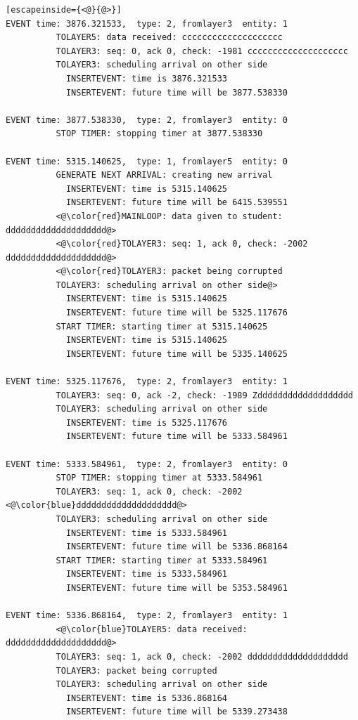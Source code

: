 \documentclass[paper=a4, fontsize=11pt]{scrartcl}
\numberwithin{equation}{section}		%
\numberwithin{figure}{section}			%
\numberwithin{table}{section}				%
\begin{document}
\begin{lstlisting}[escapeinside={<@}{@>}]
EVENT time: 3876.321533,  type: 2, fromlayer3  entity: 1
          TOLAYER5: data received: cccccccccccccccccccc
          TOLAYER3: seq: 0, ack 0, check: -1981 cccccccccccccccccccc
          TOLAYER3: scheduling arrival on other side
            INSERTEVENT: time is 3876.321533
            INSERTEVENT: future time will be 3877.538330

EVENT time: 3877.538330,  type: 2, fromlayer3  entity: 0
          STOP TIMER: stopping timer at 3877.538330

EVENT time: 5315.140625,  type: 1, fromlayer5  entity: 0
          GENERATE NEXT ARRIVAL: creating new arrival
            INSERTEVENT: time is 5315.140625
            INSERTEVENT: future time will be 6415.539551
          <@\color{red}MAINLOOP: data given to student: dddddddddddddddddddd@>
          <@\color{red}TOLAYER3: seq: 1, ack 0, check: -2002 dddddddddddddddddddd@>
          <@\color{red}TOLAYER3: packet being corrupted
          TOLAYER3: scheduling arrival on other side@>
            INSERTEVENT: time is 5315.140625
            INSERTEVENT: future time will be 5325.117676
          START TIMER: starting timer at 5315.140625
            INSERTEVENT: time is 5315.140625
            INSERTEVENT: future time will be 5335.140625

EVENT time: 5325.117676,  type: 2, fromlayer3  entity: 1
          TOLAYER3: seq: 0, ack -2, check: -1989 Zddddddddddddddddddd
          TOLAYER3: scheduling arrival on other side
            INSERTEVENT: time is 5325.117676
            INSERTEVENT: future time will be 5333.584961

EVENT time: 5333.584961,  type: 2, fromlayer3  entity: 0
          STOP TIMER: stopping timer at 5333.584961
          TOLAYER3: seq: 1, ack 0, check: -2002 <@\color{blue}dddddddddddddddddddd@>
          TOLAYER3: scheduling arrival on other side
            INSERTEVENT: time is 5333.584961
            INSERTEVENT: future time will be 5336.868164
          START TIMER: starting timer at 5333.584961
            INSERTEVENT: time is 5333.584961
            INSERTEVENT: future time will be 5353.584961

EVENT time: 5336.868164,  type: 2, fromlayer3  entity: 1
          <@\color{blue}TOLAYER5: data received: dddddddddddddddddddd@>
          TOLAYER3: seq: 1, ack 0, check: -2002 dddddddddddddddddddd
          TOLAYER3: packet being corrupted
          TOLAYER3: scheduling arrival on other side
            INSERTEVENT: time is 5336.868164
            INSERTEVENT: future time will be 5339.273438


\end{lstlisting}
\end{document}
